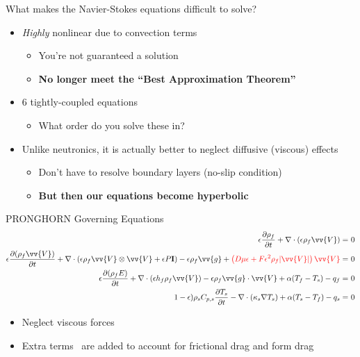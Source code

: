 \documentclass{beamer}
\begin{document}
\begin{frame}{What makes the Navier-Stokes equations difficult to solve?}

\begin{itemize}
\item \textit{Highly} nonlinear due to convection terms
	\begin{itemize}
		\item You're not guaranteed a solution
		\item \textbf{No longer meet the ``Best Approximation Theorem''}
	\end{itemize}
\item 6 tightly-coupled equations
	\begin{itemize}
		\item What order do you solve these in?
	\end{itemize}
\item Unlike neutronics, it is actually better to neglect diffusive (viscous) effects
	\begin{itemize}
		\item Don't have to resolve boundary layers (no-slip condition)
		\item \textbf{But then our equations become hyperbolic}
	\end{itemize}
\end{itemize}

\end{frame}


\begin{frame}{PRONGHORN Governing Equations}
\small
\begin{equation}
\begin{aligned}
\epsilon\frac{\partial\rho_f}{\partial t} + \nabla\cdot(\epsilon\rho_f\vv{V})=&\ 0\\
\epsilon\frac{\partial(\rho_f\vv{V})}{\partial t}+\nabla\cdot(\epsilon\rho_f\vv{V}\otimes\vv{V}+\epsilon P\textbf{I})-\epsilon\rho_f\vv{g}+\color{red}\left(D\mu\epsilon+F\epsilon^2\rho_f|\vv{V}|\right)\vv{V}\color{black}=&\ 0\\
\epsilon\frac{\partial (\rho_f E)}{\partial t}+\nabla\cdot(\epsilon h_f\rho_f\vv{V})-\epsilon\rho_f \vv{g}\cdot\vv{V}+\alpha(T_f-T_s)-q_f=&\ 0\\
1-\epsilon)\rho_sC_{p,s}\frac{\partial T_s}{\partial t}-\nabla\cdot(\kappa_s\nabla T_s)+\alpha(T_s-T_f)-q_s=&\ 0\\
\end{aligned}
\end{equation}
\normalsize
\begin{itemize}
\item Neglect viscous forces
\item \color{red}Extra terms\ \color{black} are added to account for frictional drag and form drag
\end{itemize}

\end{frame}
\end{document}

